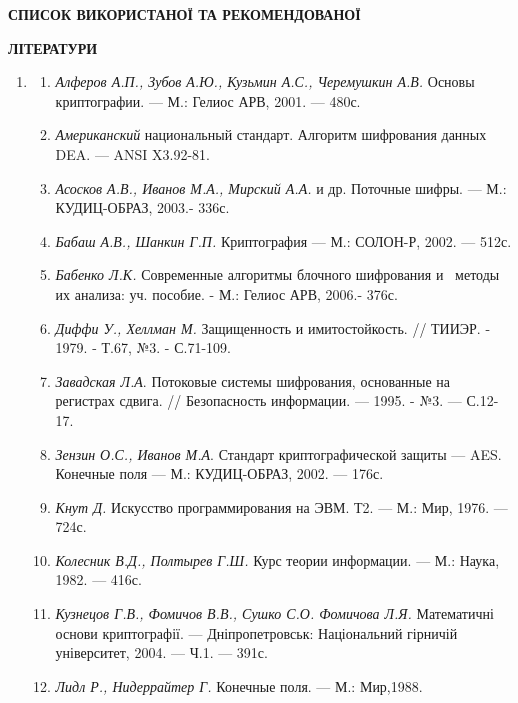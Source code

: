 {{{{{{\bigskip


\bigskip

{\centering\bfseries
СПИСОК  ВИКОРИСТАНОЇ  ТА  РЕКОМЕНДОВАНОЇ
\par}

{\centering\bfseries
ЛІТЕРАТУРИ
\par}


\bigskip


\bigskip

\liststyleWWviiiNumli
\begin{enumerate}
\item \begin{enumerate}
\item \textit{Алфе}\textit{ров А.П., Зубов А.Ю., Кузьмин А.С., Черемушкин А.В.
}Основы криптографии. --- М.: Гелиос АРВ,  2001. --- 480с.
\item \textit{Американский} национальный стандарт. Алгоритм шифрования данных 
DEA. --- ANSI X3.92-81. 
\item \textit{Асосков А.В., Иванов М.А., Мирский А.А.} и др. Поточные шифры. ---
М.: КУДИЦ-ОБРАЗ, 2003.- 336с.
\item \textit{Бабаш А.В., Шанкин Г.П.} Криптография --- М.: СОЛОН-Р, 2002. --- 512с.
\item {\color[rgb]{0.2,0.2,0.2}
 \textit{Бабенко Л.К.} Современные алгоритмы блочного шифрования и~ методы их
анализа: уч. пособие. - М.: Гелиос АРВ, 2006.- 376с.}
\item {\color[rgb]{0.2,0.2,0.2}
 \textit{Диффи У., Хеллман М.} Защищенность и имитостойкость. // ТИИЭР. - 1979.
- Т.67, №3. - С.71-109.}
\item \textit{Завадская Л.А}. Потоковые системы шифрования, основанные на
регистрах сдвига. // Безопасность информации. --- 1995. - №3. --- С.12-17.
\item \textit{Зензин О.С., Иванов М.А}. Стандарт криптографической защиты --- AES.
 Конечные поля --- М.: КУДИЦ-ОБРАЗ, 2002. ---  176с.
\item \textit{Кнут Д.} Искусство программирования на ЭВМ. Т2. --- М.: Мир, 1976. ---
724с.
\item \textit{Колесник В.Д., Полтырев Г.Ш.} Курс теории информации. --- М.: Наука,
1982. --- 416с. 
\item \textit{Кузнецов Г.В., Фомич}\textit{о}\textit{в В.В., Сушко С.О. Фомичова
Л.Я. }Математичні основи криптографії. --- Дніпропетровськ: Національний гірничій
університет, 2004. --- Ч.1. --- 391с.
\item \textit{Лидл Р., Нидеррайтер Г.} Конечные поля. --- М.: Мир,1988.

\end{enumerate}
\end{enumerate}}}}}}}
